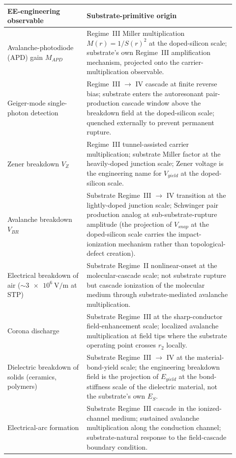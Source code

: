 \begin{table}[htbp]
\centering\small
\begin{tabular}{p{0.32\linewidth} p{0.60\linewidth}}
\toprule
\textbf{EE-engineering observable} & \textbf{Substrate-primitive origin} \\
\midrule
Avalanche-photodiode (APD) gain $M_{APD}$ & Regime~III Miller multiplication $M(r) = 1/S(r)^2$ at the doped-silicon scale; substrate's own Regime~III amplification mechanism, projected onto the carrier-multiplication observable. \\
Geiger-mode single-photon detection & Regime~III $\to$ IV cascade at finite reverse bias; substrate enters the autoresonant pair-production cascade window above the breakdown field at the doped-silicon scale; quenched externally to prevent permanent rupture. \\
Zener breakdown $V_Z$ & Regime~III tunnel-assisted carrier multiplication; substrate Miller factor at the heavily-doped junction scale; Zener voltage is the engineering name for $V_{yield}$ at the doped-silicon scale. \\
Avalanche breakdown $V_{BR}$ & Substrate Regime~III $\to$ IV transition at the lightly-doped junction scale; Schwinger pair production analog at sub-substrate-rupture amplitude (the projection of $V_{snap}$ at the doped-silicon scale carries the impact-ionization mechanism rather than topological-defect creation). \\
Electrical breakdown of air ($\sim \qty{3e6}{\volt\per\metre}$ at STP) & Substrate Regime~II nonlinear-onset at the molecular-cascade scale; not substrate rupture but cascade ionization of the molecular medium through substrate-mediated avalanche multiplication. \\
Corona discharge & Substrate Regime~III at the sharp-conductor field-enhancement scale; localized avalanche multiplication at field tips where the substrate operating point crosses $r_2$ locally. \\
Dielectric breakdown of solids (ceramics, polymers) & Substrate Regime~III $\to$ IV at the material-bond-yield scale; the engineering breakdown field is the projection of $E_{yield}$ at the bond-stiffness scale of the dielectric material, not the substrate's own $E_S$. \\
Electrical-arc formation & Substrate Regime~III cascade in the ionized-channel medium; sustained avalanche multiplication along the conduction channel; substrate-natural response to the field-cascade boundary condition. \\

\end{tabular}
\end{table}
